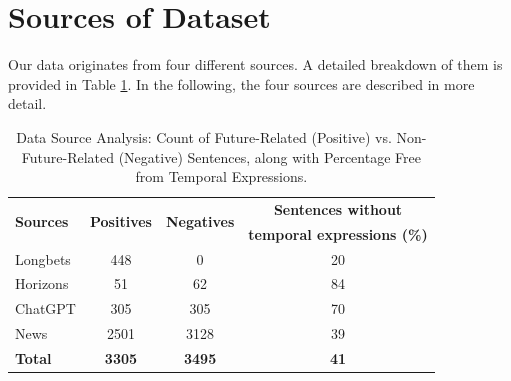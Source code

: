 \documentclass[a4paper,10pt]{report}
\begin{document}
\section{Sources of Dataset}
Our data originates from four different sources. A detailed breakdown of them is provided in Table \ref{tab:dataset}. In the following, the four sources are described in more detail.

\begin{table}[h]
  \centering
  \begin{tabular}{lccc}
    \toprule
    \multirow{2}{*}{\textbf{Sources}} & \multirow{2}{*}{\textbf{Positives}} & \multirow{2}{*}{\textbf{Negatives}} & \textbf{Sentences without} \\
    & & & \textbf{temporal expressions (\%)} \\
    \midrule
    Longbets & 448 & 0 & 20 \\
    Horizons & 51 & 62 & 84 \\
    ChatGPT & 305 & 305 & 70 \\
    News & 2501 & 3128 & 39 \\
    \bottomrule
    \textbf{Total} & \textbf{3305} & \textbf{3495} & \textbf{41} \\
  \bottomrule
  \end{tabular}
  \caption{Data Source Analysis: Count of Future-Related (Positive) vs. Non-Future-Related (Negative) Sentences, along with Percentage Free from Temporal Expressions.}
  \label{tab:dataset}
\end{table}
\end{document}
